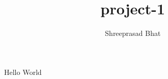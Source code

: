 \documentclass[12pt]{article}
\title{project-1}
\author{Shreeprasad Bhat}
\begin{document}
\maketitle
Hello World
\end{document}
